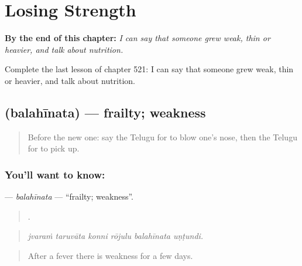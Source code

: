 
\chapter{Losing Strength}
\label{ch:te-losing-strength}

\begin{chapteropening}
\textbf{By the end of this chapter:} \emph{I can say that someone grew weak, thin or heavier, and talk about nutrition.}

Complete the last lesson of chapter 521: I can say that someone grew weak, thin or heavier, and talk about nutrition.
\end{chapteropening}

\section[\texorpdfstring{\te{బలహీనత} (balahīnata)}{బలహీనత (balahīnata)}]{ (balahīnata) — frailty; weakness}

\label{lesson:TE-C521-balahinata}



\begin{quote}
Before the new one: say the Telugu for to blow one's nose, then the Telugu for to pick up.
\end{quote}

\subsection*{You'll want to know: }
\textbf{} — \emph{balahīnata} — \textquotedblleft{}frailty; weakness\textquotedblright{}.

\begin{quote}
     .
\end{quote}

\begin{quote}
\emph{jvaraṁ taruvāta konni rōjulu balahīnata uṇṭundi.}
\end{quote}

\begin{quote}
After a fever there is weakness for a few days.
\end{quote}

